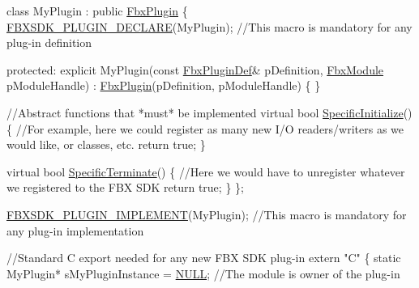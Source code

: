 \begin{DoxyCode}
\textcolor{keyword}{class }MyPlugin : \textcolor{keyword}{public} \hyperlink{class_fbx_plugin}{FbxPlugin}
\{
    \hyperlink{fbxplugin_8h_a82867e434a2a4a1b8f16632928649b07}{FBXSDK\_PLUGIN\_DECLARE}(MyPlugin); \textcolor{comment}{//This macro is mandatory for any plug-in
       definition}

\textcolor{keyword}{protected}:
    \textcolor{keyword}{explicit} MyPlugin(\textcolor{keyword}{const} \hyperlink{struct_fbx_plugin_def}{FbxPluginDef}& pDefinition, \hyperlink{fbxmodule_8h_a1d2ed3e9ccb8075d585f7cb7bdf40420}{FbxModule} pModuleHandle) : 
      \hyperlink{class_fbx_plugin}{FbxPlugin}(pDefinition, pModuleHandle)
    \{
    \}

    \textcolor{comment}{//Abstract functions that *must* be implemented}
    \textcolor{keyword}{virtual} \textcolor{keywordtype}{bool} \hyperlink{class_fbx_plugin_a5b6ba0af2c0cf8a7d5cb1680407d9e7e}{SpecificInitialize}()
    \{
        \textcolor{comment}{//For example, here we could register as many new I/O readers/writers as we would like, or classes,
       etc.}
        \textcolor{keywordflow}{return} \textcolor{keyword}{true};
    \}

    \textcolor{keyword}{virtual} \textcolor{keywordtype}{bool} \hyperlink{class_fbx_plugin_ade394d2752689a4690a29b34d347446e}{SpecificTerminate}()
    \{
        \textcolor{comment}{//Here we would have to unregister whatever we registered to the FBX SDK}
        \textcolor{keywordflow}{return} \textcolor{keyword}{true};
    \}
\};

\hyperlink{fbxplugin_8h_a94a72a1e3b950d4d488f036a4f7f35bb}{FBXSDK\_PLUGIN\_IMPLEMENT}(MyPlugin); \textcolor{comment}{//This macro is mandatory for any plug-in
       implementation}

\textcolor{comment}{//Standard C export needed for any new FBX SDK plug-in}
\textcolor{keyword}{extern} \textcolor{stringliteral}{"C"}
\{
    \textcolor{keyword}{static} MyPlugin* sMyPluginInstance = \hyperlink{fbxarch_8h_a070d2ce7b6bb7e5c05602aa8c308d0c4}{NULL}; \textcolor{comment}{//The module is owner of the plug-in}


\end{DoxyCode}
